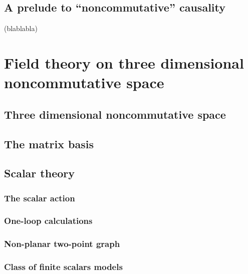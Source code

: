 \documentclass[10pt]{book}
\theoremstyle{break}
\begin{document}
\section{A prelude to ``noncommutative'' causality}


(blablabla)


\chapter{Field theory on three dimensional noncommutative space}


\section{Three dimensional noncommutative space}

\section{The matrix basis}

\section{Scalar theory}
\subsection{The scalar action}

\subsection{One-loop calculations}

\subsection{Non-planar two-point graph}

\subsection{Class of finite scalars models}
\end{document}
